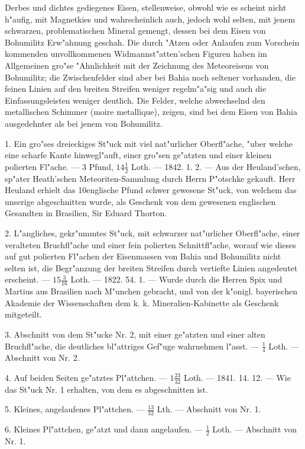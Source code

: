 \documentclass[a4paper, 11pt, oneside, polutonikogreek, german]{article}
\begin{document}
Derbes und dichtes gediegenes Eisen, stellenweise, obwohl wie es scheint nicht h"aufig, mit Magnetkies und wahrscheinlich auch, jedoch wohl selten, mit jenem schwarzen, problematischen Mineral gemengt, dessen bei dem Eisen von Bohumilitz Erw"ahnung geschah. Die durch "Atzen oder Anlaufen zum Vorschein kommenden unvollkommenen Widmannst"atten'schen Figuren haben im Allgemeinen gro"se "Ahnlichkeit mit der Zeichnung des Meteoreisens von Bohumilitz; die Zwischenfelder sind aber bei Bahia noch seltener vorhanden, die feinen Linien auf den breiten Streifen weniger regelm"a"sig und auch die Einfassungsleisten weniger deutlich. Die Felder, welche abwechselnd den metallischen Schimmer (moire metallique), zeigen, sind bei dem Eisen von Bahia ausgedehnter als bei jenem von Bohumilitz.

1. Ein gro"ses dreieckiges St"uck mit viel nat"urlicher Oberfl"ache, "uber welche eine scharfe Kante hinwegl"auft, einer gro"sen ge"atzten und einer kleinen polierten Fl"ache. --- 3 Pfund, $14\frac{1}{2}$ Loth. --- 1842. 1. 2. --- Aus der Heuland'schen, sp"ater Heath'schen Meteoriten-Sammlung durch Herrn P"otschke gekauft. Herr Heuland erhielt das 10englische Pfund schwer gewesene St"uck, von welchem das unserige abgeschnitten wurde, als Geschenk von dem gewesenen englischen Gesandten in Brasilien, Sir Eduard Thorton.

2. L"angliches, gekr"ummtes St"uck, mit schwarzer nat"urlicher Oberfl"ache, einer veralteten Bruchfl"ache und einer fein polierten Schnittfl"ache, worauf wie dieses auf gut polierten Fl"achen der Eisenmassen von Bahia und Bohumilitz nicht selten ist, die Begr"anzung der breiten Streifen durch vertiefte Linien angedeutet erscheint. --- $15\frac{3}{16}$ Loth. --- 1822. 54. 1. --- Wurde durch die Herren Spix und Martius aus Brasilien nach M"unchen gebracht, und von der k"onigl. bayerischen Akademie der Wissenschaften dem k. k. Mineralien-Kabinette als Geschenk mitgeteilt.

3. Abschnitt von dem St"ucke Nr. 2, mit einer ge"atzten und einer alten Bruchfl"ache, die deutliches bl"attriges Gef"uge wahrnehmen l"asst. --- $\frac{1}{4}$ Loth. --- Abschnitt von Nr. 2.

4. Auf beiden Seiten ge"atztes Pl"attchen. --- $1\frac{23}{32}$ Loth. --- 1841. 14. 12. --- Wie das St"uck Nr. 1 erhalten, von dem es abgeschnitten ist.

5. Kleines, angelaufenes Pl"attchen. --- $\frac{13}{32}$ Lth. --- Abschnitt von Nr. 1.

6. Kleines Pl"attchen, ge"atzt und dann angelaufen. --- $\frac{1}{2}$ Loth. --- Abschnitt von Nr. 1.
\end{document}
